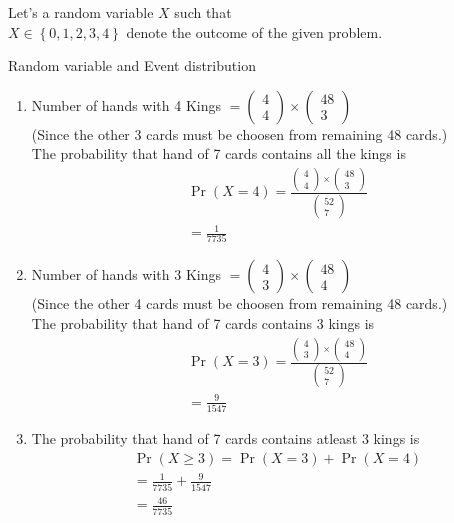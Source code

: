 \documentclass[journal,12pt,twocolumn]{IEEEtran}
\providecommand{\pr}[1]{\ensuremath{\Pr\left(#1\right)}}
\providecommand{\cbrak}[1]{\ensuremath{\left\{#1\right\}}}
\newcommand{\myvec}[1]{\ensuremath{\begin{pmatrix}#1\end{pmatrix}}}
\begin{document}
Let's a random variable $X$ such that \\
$X\in \cbrak{0,1,2,3,4}$ denote the outcome of the given problem.
\begin{table}[H]

	\caption{Random variable and Event distribution}
	\label{tab1}
\end{table}
\begin{enumerate}[label=(\roman{enumi})]
      \item Number of hands with 4 Kings $=\myvec{4 \\ 4}\times \myvec{48 \\ 3}$\\
      (Since the other 3 cards must be choosen from remaining 48 cards.)\\
      The probability that hand of 7 cards contains all the kings is
\begin{align}
		 &\pr{X=4}=\frac{\myvec{4 \\ 4}\times \myvec{48 \\ 3}}{\myvec{52 \\ 7}}\\
		 &=\frac{1}{7735}
\end{align}
      \item Number of hands with 3 Kings $=\myvec{4 \\ 3}\times\myvec{48 \\ 4}$\\
      (Since the other 4 cards must be choosen from remaining 48 cards.)\\
      The probability that hand of 7 cards contains 3 kings is
\begin{align}
		 &\pr{X=3}=\frac{\myvec{4 \\ 3}\times \myvec{48 \\ 4}}{\myvec{52 \\ 7}}\\
		 &=\frac{9}{1547}
\end{align}
      \item The probability that hand of 7 cards contains atleast 3 kings is
\begin{align}
     &\pr{X\geq 3}=\pr{X=3}+\pr{X=4}\\
	 &=\frac{1}{7735}+\frac{9}{1547}\\
	 &=\frac{46}{7735}
\end{align}
\end{enumerate}
\end{document}
